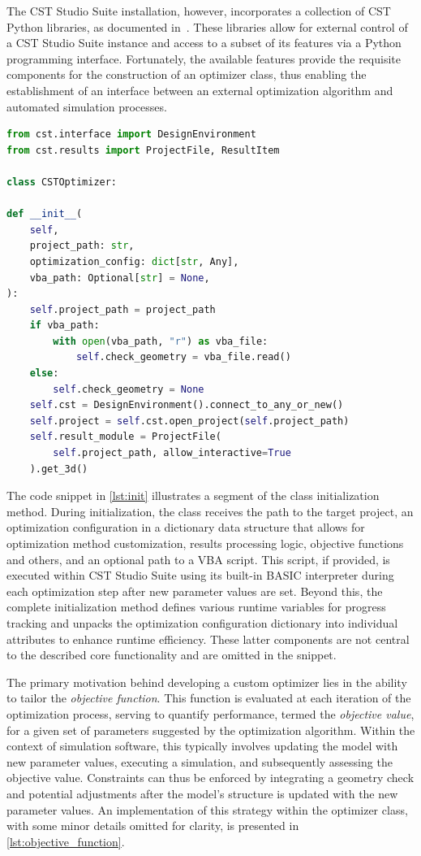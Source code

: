 \documentclass[11pt,a4paper,twoside,openany]{report}
\begin{document}
The CST Studio Suite installation, however, incorporates a collection of CST Python libraries, as documented in~\parencite{cst:python-libraries-documentation}. These libraries allow for external control of a CST Studio Suite instance and access to a subset of its features via a Python programming interface.  Fortunately, the available features provide the requisite components for the construction of an optimizer class, thus enabling the establishment of an interface between an external optimization algorithm and automated simulation processes.

\begin{lstlisting}[caption={Optimizer class initialization}, label={lst:init}, language=Python]
from cst.interface import DesignEnvironment
from cst.results import ProjectFile, ResultItem

class CSTOptimizer:

def __init__(
    self,
    project_path: str,
    optimization_config: dict[str, Any],
    vba_path: Optional[str] = None,
):
    self.project_path = project_path
    if vba_path:
        with open(vba_path, "r") as vba_file:
            self.check_geometry = vba_file.read()
    else:
        self.check_geometry = None
    self.cst = DesignEnvironment().connect_to_any_or_new()
    self.project = self.cst.open_project(self.project_path)
    self.result_module = ProjectFile(
        self.project_path, allow_interactive=True
    ).get_3d()
\end{lstlisting}

The code snippet in \cref{lst:init} illustrates a segment of the class initialization method. During initialization, the class receives the path to the target project, an optimization configuration in a dictionary data structure that allows for optimization method customization, results processing logic, objective functions and others, and an optional path to a VBA script. This script, if provided, is executed within CST Studio Suite using its built-in BASIC interpreter during each optimization step after new parameter values are set. Beyond this, the complete initialization method defines various runtime variables for progress tracking and unpacks the optimization configuration dictionary into individual attributes to enhance runtime efficiency. These latter components are not central to the described core functionality and are omitted in the snippet.

The primary motivation behind developing a custom optimizer lies in the ability to tailor the \emph{objective function}. This function is evaluated at each iteration of the optimization process, serving to quantify performance, termed the \emph{objective value}, for a given set of parameters suggested by the optimization algorithm. Within the context of simulation software, this typically involves updating the model with new parameter values, executing a simulation, and subsequently assessing the objective value. Constraints can thus be enforced by integrating a geometry check and potential adjustments after the model's structure is updated with the new parameter values. An implementation of this strategy within the optimizer class, with some minor details omitted for clarity, is presented in \cref{lst:objective_function}.
\end{document}
